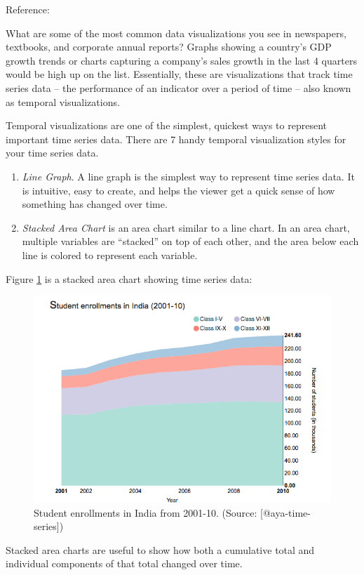 \documentclass[]{book}
\theoremstyle{definition}
\theoremstyle{definition}
\theoremstyle{definition}
\theoremstyle{remark}
\begin{document}
Reference: \citep{aya-time-series}

What are some of the most common data visualizations you see in
newspapers, textbooks, and corporate annual reports? Graphs showing a
country's GDP growth trends or charts capturing a company's sales growth
in the last 4 quarters would be high up on the list. Essentially, these
are visualizations that track time series data -- the performance of an
indicator over a period of time -- also known as temporal
visualizations.

Temporal visualizations are one of the simplest, quickest ways to
represent important time series data. There are 7 handy temporal
visualization styles for your time series data.

\begin{enumerate}
\def\labelenumi{\arabic{enumi}.}
\item
  \emph{Line Graph}. A line graph is the simplest way to represent time
  series data. It is intuitive, easy to create, and helps the viewer get
  a quick sense of how something has changed over time.
\item
  \emph{Stacked Area Chart} is an area chart similar to a line chart. In
  an area chart, multiple variables are ``stacked'' on top of each
  other, and the area below each line is colored to represent each
  variable.
\end{enumerate}

Figure \ref{fig:aya-stacked} is a stacked area chart showing time series
data:

\begin{figure}

{\centering \includegraphics[width=0.6\linewidth]{images/aya-stacked} 

}

\caption{Student enrollments in India from 2001-10. (Source: [@aya-time-series])}\label{fig:aya-stacked}
\end{figure}

Stacked area charts are useful to show how both a cumulative total and
individual components of that total changed over time.
\end{document}
